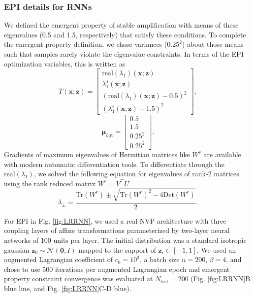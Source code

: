 \documentclass[11pt]{article}
\begin{document}
\subsubsection{EPI details for RNNs}
We defined the emergent property of stable amplification with means of these eigenvalues (0.5 and 1.5, respectively) that satisfy these conditions.
To complete the emergent property definition, we chose variances ($0.25^2$) about those means such that samples rarely violate the eigenvalue constraints.
In terms of the EPI optimization variables, this is written as
\begin{equation} 
T(\mathbf{x}; \mathbf{z}) = \begin{bmatrix} \text{real}(\lambda_1)(\mathbf{x}; \mathbf{z}) \\ \lambda_1^s(\mathbf{x}; \mathbf{z}) \\ \left(\text{real}(\lambda_1)(\mathbf{x}; \mathbf{z}) - 0.5 \right)^2 \\ \left( \lambda_1^s(\mathbf{x}; \mathbf{z})  - 1.5 \right)^2 \end{bmatrix},
\end{equation}
\begin{equation} 
\bm{\mu}_{\text{opt}} = \begin{bmatrix} 0.5 \\ 1.5 \\ 0.25^2 \\ 0.25^2 \end{bmatrix}.
\end{equation}
Gradients of maximum eigenvalues of Hermitian matrices like $W^s$ are available with modern automatic differentiation tools.
To differentiate through the $\text{real}(\lambda_1)$, we solved the following equation for eigenvalues of rank-2 matrices using the rank reduced matrix $W^r = V^{\top} U$
\begin{equation}
\lambda_{\pm} = \frac{\text{Tr}(W^r) \pm \sqrt{\text{Tr}(W^r)^2 - 4\text{Det}(W^r)}}{2}.
\end{equation}

For EPI in Fig. \ref{fig:LRRNN}, we used a real NVP architecture with three coupling layers of affine transformations parameterized by two-layer neural networks of 100 units per layer.
The initial distribution was a standard isotropic gaussian $\mathbf{z}_0 \sim \mathcal{N}(\mathbf{0}, I)$ mapped to the support of $\mathbf{z}_i \in [-1, 1]$. 
We used an augmented Lagrangian coefficient of $c_0 = 10^{3}$, a batch size $n=200$, $\beta=4$, and chose to use $500$ iterations per augmented Lagrangian epoch and emergent property constraint convergence was evaluated at $N_{\text{test}} = 200$ (Fig. \ref{fig:LRRNN}B blue line, and Fig. \ref{fig:LRRNN}C-D blue).
\end{document}
